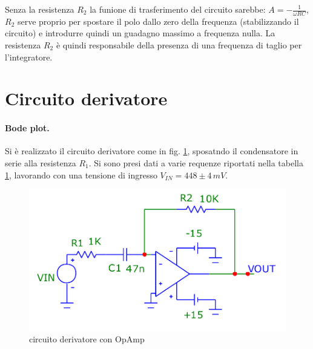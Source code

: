 \documentclass[10pt,a4paper]{article}
\begin{document}
Senza la resistenza $R_2$ la funione di trasferimento del circuito sarebbe: $A = -\frac{1}{\omega RC}$, $R_2$ serve proprio per spostare il polo dallo zero della frequenza (stabilizzando il circuito) e introdurre quindi un guadagno massimo a frequenza nulla. La resistenza $R_2$ è quindi responsabile della presenza di una frequenza di taglio per l'integratore.

\section{Circuito derivatore}
\paragraph{Bode plot.} Si è realizzato il circuito derivatore come in fig. \ref{derivatore}, sposatndo il condensatore in serie alla resistenza $R_1$. Si sono presi dati a varie requenze riportati nella tabella \ref{derivatore}, lavorando con una tensione di ingresso $V_{IN} = 448 \pm 4 \, mV$.\\

\begin{figure}[!htb]
\centering
  \includegraphics[scale=0.25]{derivatore.png}
\caption{circuito derivatore con OpAmp}
\label{derivatore}
\end{figure}
\end{document}
